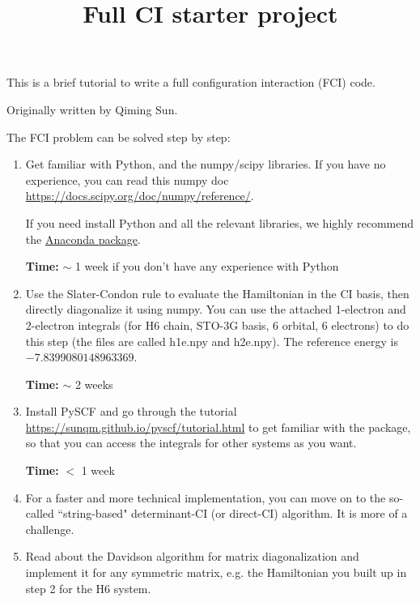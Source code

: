 \documentclass{article}
\title{Full CI starter project}
\date{}
\begin{document}
\maketitle

This is a brief tutorial to write a full configuration interaction (FCI) code.

\vspace{1cm}

Originally written by Qiming Sun.

\vspace{1cm}

The FCI problem can be solved step by step:

\begin{enumerate}

\item Get familiar with Python, and the numpy/scipy libraries. If you have no experience, 
      you can read this numpy doc
      \url{https://docs.scipy.org/doc/numpy/reference/}.

      If you need install Python and all the relevant libraries, we highly recommend
      the \href{https://www.anaconda.com/distribution/}{Anaconda package}.

      \textbf{Time:} $\sim$ 1 week if you don't have any experience with Python

\item Use the Slater-Condon rule to evaluate the Hamiltonian in the CI basis,
      then directly diagonalize it using numpy.  You can use the attached
      1-electron and 2-electron integrals (for H6 chain, STO-3G basis, 6
      orbital, 6 electrons) to do this step (the files are called h1e.npy and h2e.npy).  
      The reference energy is $-7.8399080148963369$.
      
      \textbf{Time:} $\sim$ 2 weeks


\item  Install PySCF and go through the tutorial \url{https://sunqm.github.io/pyscf/tutorial.html}
       to get familiar with the package, so that you can access the integrals
       for other systems as you want.

       \textbf{Time:} $<$ 1 week


\item   For a faster and more technical implementation, you can move on to the 
        so-called ``string-based"
        determinant-CI (or direct-CI) algorithm.  It is more of a challenge.

\item   Read about the Davidson algorithm for matrix diagonalization
        and implement it for any symmetric matrix, e.g. the Hamiltonian you 
        built up in step 2 for the H6 system.


\end{enumerate}
\end{document}
